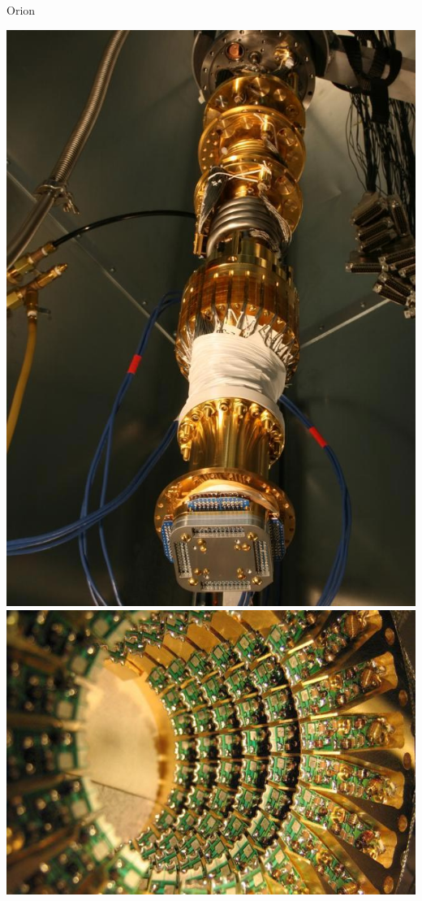 \documentclass{beamer}
\begin{document}
\begin{frame}{Orion}
\begin{center}
 \includegraphics[scale=.125]{../img/Orion}
  \includegraphics[scale=.3]{../img/Open_Orion}
\end{center}
 

\end{frame}
\end{document}
